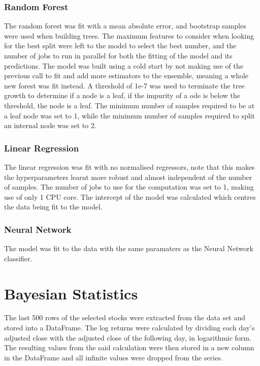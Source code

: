 \subsubsection{Random Forest}
The random forest was fit with a mean absolute error, and bootstrap samples were used when building trees. The maximum features to consider when looking for the best split were left to the model to select the best number, and the number of jobs to run in parallel for both the fitting of the model and its predictions. The model was built using a cold start by not making use of the previous call to fit and add more estimators to the ensemble, meaning a whole new forest was fit instead. A threshold of 1e-7 was used to terminate the tree growth to determine if a node is a leaf, if the impurity of a ode is below the threshold, the node is a leaf. The minimum number of samples required to be at a leaf node was set to 1, while the minimum number of samples required to split an internal node was set to 2.

\subsubsection{Linear Regression}
The linear regression was fit with no normalised regressors, note that this makes the hyperparameters learnt more robust and almost independent of the number of samples. The number of jobs to use for the computation was set to 1, making use of only 1 CPU core. The intercept of the model was calculated which centres the data being fit to the model.

\subsubsection{Neural Network}
The model was fit to the data with the same paramaters as the Neural Network classifier.

\section{Bayesian Statistics}
The last 500 rows of the selected stocks were extracted from the data set and stored into a DataFrame. The log returns were calculated by dividing each day's adjusted close with the adjusted close of the following day, in logarithmic form. The resulting values from the said calculation were then stored in a new column in the DataFrame and all infinite values were dropped from the series.

